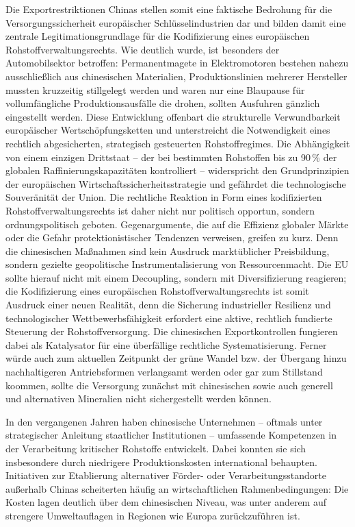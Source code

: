 \documentclass[12pt,a4paper,oneside]{book} %
\begin{document}
Die Exportrestriktionen Chinas stellen somit eine faktische Bedrohung für die Versorgungssicherheit europäischer Schlüsselindustrien dar und bilden damit eine zentrale Legitimationsgrundlage für die Kodifizierung eines europäischen Rohstoffverwaltungsrechts. Wie deutlich wurde, ist besonders der Automobilsektor betroffen: Permanentmagete in Elektromotoren bestehen nahezu ausschließlich aus chinesischen Materialien, Produktionslinien mehrerer Hersteller mussten kruzzeitig stillgelegt werden und waren nur eine Blaupause für vollumfängliche Produktionsausfälle die drohen, sollten Ausfuhren gänzlich eingestellt werden.
Diese Entwicklung offenbart die strukturelle Verwundbarkeit europäischer Wertschöpfungsketten und unterstreicht die Notwendigkeit eines rechtlich abgesicherten, strategisch gesteuerten Rohstoffregimes. Die Abhängigkeit von einem einzigen Drittstaat -- der bei bestimmten Rohstoffen bis zu 90 \% der globalen Raffinierungskapazitäten kontrolliert -- widerspricht den Grundprinzipien der europäischen Wirtschaftssicherheitsstrategie und gefährdet die technologische Souveränität der Union. Die rechtliche Reaktion in Form eines kodifizierten Rohstoffverwaltungsrechts ist daher nicht nur politisch opportun, sondern ordnungspolitisch geboten. Gegenargumente, die auf die Effizienz globaler Märkte oder die Gefahr protektionistischer Tendenzen verweisen, greifen zu kurz. Denn die chinesischen Maßnahmen sind kein Ausdruck marktüblicher Preisbildung, sondern gezielte geopolitische Instrumentalisierung von Ressourcenmacht. Die EU sollte hierauf nicht mit einem Decoupling, sondern mit Diversifizierung reagieren; die Kodifizierung eines europäischen Rohstoffverwaltungsrechts ist somit Ausdruck einer neuen Realität, denn die Sicherung industrieller Resilienz und technologischer Wettbewerbsfähigkeit erfordert eine aktive, rechtlich fundierte Steuerung der Rohstoffversorgung. Die chinesischen Exportkontrollen fungieren dabei als Katalysator für eine überfällige rechtliche Systematisierung. Ferner würde auch zum aktuellen Zeitpunkt der grüne Wandel bzw. der Übergang hinzu nachhaltigeren Antriebsformen verlangsamt werden oder gar zum Stillstand koommen, sollte die Versorgung zunächst mit chinesischen sowie auch generell und alternativen Mineralien nicht sichergestellt werden können.

In den vergangenen Jahren haben chinesische Unternehmen -- oftmals unter strategischer Anleitung staatlicher Institutionen – umfassende Kompetenzen in der Verarbeitung kritischer Rohstoffe entwickelt. Dabei konnten sie sich insbesondere durch niedrigere Produktionskosten international behaupten. Initiativen zur Etablierung alternativer Förder- oder Verarbeitungsstandorte außerhalb Chinas scheiterten häufig an wirtschaftlichen Rahmenbedingungen: Die Kosten lagen deutlich über dem chinesischen Niveau, was unter anderem auf strengere Umweltauflagen in Regionen wie Europa zurückzuführen ist.
\end{document}

